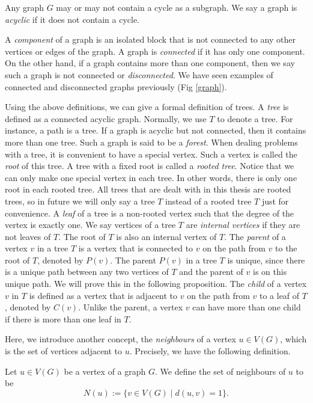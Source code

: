 Any graph $G$ may or may not contain a cycle as a subgraph. We say a graph is {\it{acyclic}} if it does not contain a cycle. 

A \emph{component} of a graph is an isolated block that is not connected to any other vertices or edges of the graph. A graph is {\it{connected}} if it has only one component. On the other hand, if a graph contains more than one component, then we say such a graph is not connected or {\it{disconnected}}. We have seen examples of connected and disconnected graphs previously (Fig \ref{graph}). 

Using the above definitions, we can give a formal definition of trees. A {\it{tree}} is defined as a connected acyclic graph. Normally, we use $T$ to denote a tree. For instance, a path is a tree. If a graph is acyclic but not connected, then it contains more than one tree. Such a graph is said to be a {\it{forest}}. When dealing problems with a tree, it is convenient to have a special vertex. Such a vertex is called the \emph{root} of this tree. A tree with a fixed root is called a {\it{rooted tree}}. Notice that we can only make one special vertex in each tree. In other words, there is only one root in each rooted tree. All trees that are dealt with in this thesis are rooted trees, so in future we will only say a tree $T$ instead of a rooted tree $T$ just for convenience. A {\it{leaf}} of a tree is a non-rooted vertex such that the degree of the vertex is exactly one. We say vertices of a tree $T$ are \textit{internal vertices} if they are not leaves of $T$. The root of $T$ is also an internal vertex of $T$. The {\it{parent}} of a vertex $v$ in a tree $T$ is a vertex that is connected to $v$ on the path from $v$ to the root of $T$, denoted by $P(v)$. The parent $P(v)$ in a tree $T$ is unique, since there is a unique path between any two vertices of $T$ and the parent of $v$ is on this unique path. We will prove this in the following proposition. The {\it{child}} of a vertex $v$ in $T$ is defined as a vertex that is adjacent to $v$ on the path from $v$ to a leaf of $T$, denoted by $C(v)$. Unlike the parent, a vertex $v$ can have more than one child if there is more than one leaf in $T$. 

Here, we introduce another concept, the \emph{neighbours} of a vertex $u \in V(G)$, which is the set of vertices adjacent to $u$. Precisely, we have the following definition. 

\begin{definition}
\label{neighbour}
Let $u \in V(G)$ be a vertex of a graph $G$. We define the set of neighbours of $u$ to be  
\[
N(u) := \{v \in V(G) \mid d(u,v) = 1\}.
\]
\end{definition}

